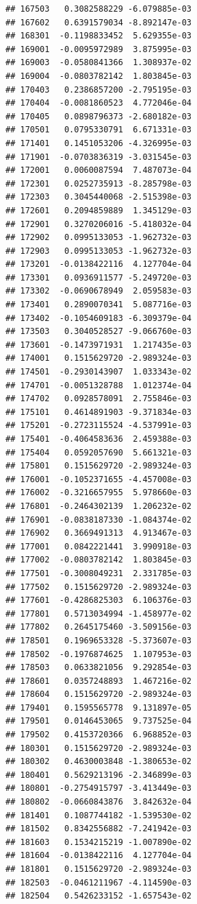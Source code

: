\begin{frame}[fragile]
\begin{verbatim}
## 167503   0.3082588229 -6.079885e-03
## 167602   0.6391579034 -8.892147e-03
## 168301  -0.1198833452  5.629355e-03
## 169001  -0.0095972989  3.875995e-03
## 169003  -0.0580841366  1.308937e-02
## 169004  -0.0803782142  1.803845e-03
## 170403   0.2386857200 -2.795195e-03
## 170404  -0.0081860523  4.772046e-04
## 170405   0.0898796373 -2.680182e-03
## 170501   0.0795330791  6.671331e-03
## 171401   0.1451053206 -4.326995e-03
## 171901  -0.0703836319 -3.031545e-03
## 172001   0.0060087594  7.487073e-04
## 172301   0.0252735913 -8.285798e-03
## 172303   0.3045440068 -2.515398e-03
## 172601   0.2094859889  1.345129e-03
## 172901   0.3270206016 -5.418032e-04
## 172902   0.0995133053 -1.962732e-03
## 172903   0.0995133053 -1.962732e-03
## 173201  -0.0138422116  4.127704e-04
## 173301   0.0936911577 -5.249720e-03
## 173302  -0.0690678949  2.059583e-03
## 173401   0.2890070341  5.087716e-03
## 173402  -0.1054609183 -6.309379e-04
## 173503   0.3040528527 -9.066760e-03
## 173601  -0.1473971931  1.217435e-03
## 174001   0.1515629720 -2.989324e-03
## 174501  -0.2930143907  1.033343e-02
## 174701  -0.0051328788  1.012374e-04
## 174702   0.0928578091  2.755846e-03
## 175101   0.4614891903 -9.371834e-03
## 175201  -0.2723115524 -4.537991e-03
## 175401  -0.4064583636  2.459388e-03
## 175404   0.0592057690  5.661321e-03
## 175801   0.1515629720 -2.989324e-03
## 176001  -0.1052371655 -4.457008e-03
## 176002  -0.3216657955  5.978660e-03
## 176801  -0.2464302139  1.206232e-02
## 176901  -0.0838187330 -1.084374e-02
## 176902   0.3669491313  4.913467e-03
## 177001   0.0842221441  3.990918e-03
## 177002  -0.0803782142  1.803845e-03
## 177501  -0.3008049231  2.331785e-03
## 177502   0.1515629720 -2.989324e-03
## 177601  -0.4286825303  6.106376e-03
## 177801   0.5713034994 -1.458977e-02
## 177802   0.2645175460 -3.509156e-03
## 178501   0.1969653328 -5.373607e-03
## 178502  -0.1976874625  1.107953e-03
## 178503   0.0633821056  9.292854e-03
## 178601   0.0357248893  1.467216e-02
## 178604   0.1515629720 -2.989324e-03
## 179401   0.1595565778  9.131897e-05
## 179501   0.0146453065  9.737525e-04
## 179502   0.4153720366  6.968852e-03
## 180301   0.1515629720 -2.989324e-03
## 180302   0.4630003848 -1.380653e-02
## 180401   0.5629213196 -2.346899e-03
## 180801  -0.2754915797 -3.413449e-03
## 180802  -0.0660843876  3.842632e-04
## 181401   0.1087744182 -1.539530e-02
## 181502   0.8342556882 -7.241942e-03
## 181603   0.1534215219 -1.007890e-02
## 181604  -0.0138422116  4.127704e-04
## 181801   0.1515629720 -2.989324e-03
## 182503  -0.0461211967 -4.114590e-03
## 182504   0.5426233152 -1.657543e-02

\end{verbatim}
\end{frame}
